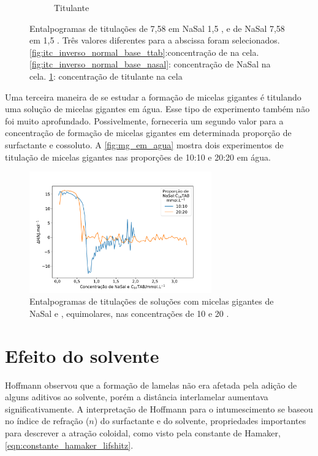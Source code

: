 \begin{figure}
\begin{subfigure}{0.3\textwidth}
				\caption{Titulante}
				\label{fig:itc_inverso_normal_basecomum}
			\end{subfigure}
			\caption{Entalpogramas de titulações de \TTAB{} 7,58 \mM{} em NaSal 1,5 \mM{}, e de NaSal 7,58 \mM{} em \TTAB{} 1,5 \mM{}. Três valores diferentes para a abscissa foram selecionados. \ref{fig:itc_inverso_normal_base_ttab}:concentração de \TTAB{} na cela. \ref{fig:itc_inverso_normal_base_nasal}: concentração de NaSal na cela. \ref{fig:itc_inverso_normal_basecomum}: concentração de titulante na cela}
			\label{fig:itc_inverso_normal_bases}
		\end{figure}
			
		Uma terceira maneira de se estudar a formação de micelas gigantes é titulando uma solução de micelas gigantes em água. Esse tipo de experimento também não foi muito aprofundado. Possivelmente, forneceria um segundo valor para a concentração de formação de micelas gigantes em determinada proporção de surfactante e cossoluto. A \autoref{fig:mg_em_agua} mostra dois experimentos de titulação de micelas gigantes nas proporções de 10:10 e 20:20 em água.

		\begin{figure}[h]
			\centering
			\includegraphics[width=0.7\textwidth]{imagens/itc/MG_em_agua}
			\caption{Entalpogramas de titulações de soluções com micelas gigantes de NaSal e \TTAB{}, equimolares, nas concentrações de 10 e 20 \mM.}
			\label{fig:mg_em_agua}
		\end{figure}

		\FloatBarrier

		\section{Efeito do solvente} 
		\label{sec:efeito_solvente}
		
		Hoffmann observou\cite{Grabner2014, Song2008a, Shinto2012} que a formação de lamelas não era afetada pela adição de alguns aditivos ao solvente, porém a distância interlamelar aumentava significativamente. A interpretação de Hoffmann para o intumescimento se baseou no índice de refração (\(n\)) do surfactante e do solvente, propriedades importantes para descrever a atração coloidal, como visto pela constante de Hamaker, \autoref{eqn:constante_hamaker_lifshitz}.
		
